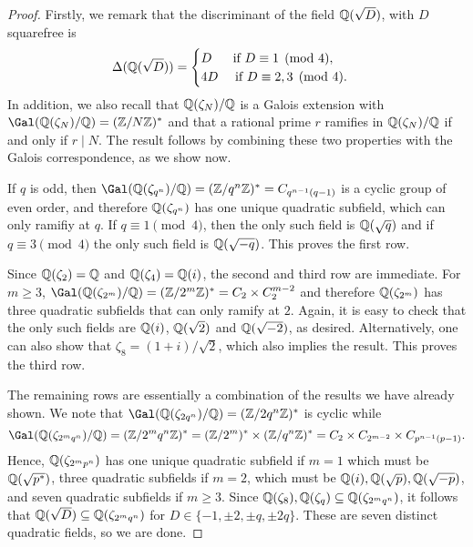 \begin{proof}
    Firstly, we remark that the discriminant of the field $\mathbb{Q}(\sqrt{D})$, with $D$ squarefree is
    \begin{equation}
        \Delta(\mathbb{Q}(\sqrt{D}))=
        \begin{cases}
            D \ \quad\text{  if } D\equiv1\pmod{4},\\
            4D \quad\text{ if } D\equiv2,3\pmod{4}.
        \end{cases}
    \end{equation}
    In addition, we also recall that $\mathbb{Q}(\zeta_N)/\mathbb{Q}$ is a Galois extension with $\Gal(\QQ(\zeta_N)/\QQ)=(\ZZ/N\ZZ)^*$ and that a rational prime $r$ ramifies in $\mathbb{Q}(\zeta_N)/\mathbb{Q}$ if and only if $r\mid N$. The result follows by combining these two properties with the Galois correspondence, as we show now.

    If $q$ is odd, then $\Gal(\QQ(\zeta_{q^n})/\QQ)=(\ZZ/q^n\ZZ)^*=C_{q^{n-1}(q-1)}$ is a cyclic group of even order, and therefore $\mathbb{Q}(\zeta_{q^n})$ has one unique quadratic subfield, which can only ramifiy at $q$. If $q\equiv1\pmod{4}$, then the only such field is $\mathbb{Q}(\sqrt{q})$ and if $q\equiv3\pmod{4}$ the only such field is $\mathbb{Q}(\sqrt{-q})$. This proves the first row. 

    Since $\mathbb{Q}(\zeta_2)=\mathbb{Q}$ and $\mathbb{Q}(\zeta_4)=\mathbb{Q}(i)$, the second and third row are immediate. For $m\geq3$, $\Gal(\QQ(\zeta_{2^m})/\QQ)=(\ZZ/2^m\ZZ)^*=C_2\times C_2^{m-2}$ and therefore $\mathbb{Q}(\zeta_{2^m})$ has three quadratic subfields that can only ramify at $2$. Again, it is easy to check that the only such fields are $\mathbb{Q}(i)$, $\mathbb{Q}(\sqrt{2})$ and $\mathbb{Q}(\sqrt{-2})$, as desired. Alternatively, one can also show that $\zeta_8=(1+i)/\sqrt{2}$, which also implies the result. This proves the third row.

    The remaining rows are essentially a combination of the results we have already shown. We note that $\Gal(\QQ(\zeta_{2q^n})/\QQ)=(\ZZ/2q^n\ZZ)^*$ is cyclic while 
    $$\Gal(\QQ(\zeta_{2^mq^n})/\QQ)=(\ZZ/2^mq^n\ZZ)^*=(\ZZ/2^m)^*\times(\ZZ/q^n\ZZ)^*=C_2\times C_{2^{m-2}}\times C_{p^{n-1}(p-1)}.$$
    Hence, $\mathbb{Q}(\zeta_{2^mp^n})$ has one unique quadratic subfield if $m=1$ which must be $\mathbb{Q}(\sqrt{p^*})$, three quadratic subfields if $m=2$, which must be $\mathbb{Q}(i),\mathbb{Q}(\sqrt{p}),\mathbb{Q}(\sqrt{-p})$, and seven quadratic subfields if $m\geq 3$. Since $\mathbb{Q}(\zeta_8),\mathbb{Q}(\zeta_q)\subseteq\mathbb{Q}(\zeta_{2^mq^n})$, it follows that $\mathbb{Q}(\sqrt{D})\subseteq\mathbb{Q}(\zeta_{2^mq^n})$ for $D\in\{-1,\pm2,\pm q,\pm 2q\}$. These are seven distinct quadratic fields, so we are done.
\end{proof}


